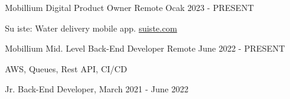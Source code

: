
\begin{cventries}
  \cventry
    {Mobillium} %
    {Digital Product Owner} %
    {Remote} %
    {Ocak 2023 - PRESENT} %
    {
      \begin{cvitems} %
        \item Su iste: Water delivery mobile app. {\href{https://suiste.com/en}{suiste.com}}
      \end{cvitems}
    }
  \cventry
    {Mobillium} %
    {Mid. Level Back-End Developer} %
    {Remote} %
    {June 2022 - PRESENT} %
    {
      \begin{cvitems} %
        \item AWS, Queues, Rest API, CI/CD
      	\item Jr. Back-End Developer, March 2021 - June 2022
      \end{cvitems}
    }
\end{cventries}
